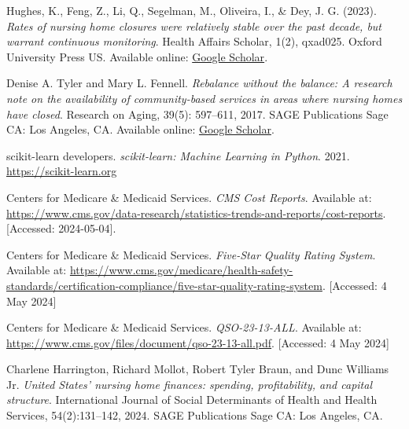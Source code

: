 \documentclass{article}
\theoremstyle{mytheoremstyle}
\theoremstyle{mytheoremstyle}
\theoremstyle{myproblemstyle}
\begin{document}
\begin{thebibliography}{9}

Hughes, K., Feng, Z., Li, Q., Segelman, M., Oliveira, I., \& Dey, J. G. (2023).
\textit{Rates of nursing home closures were relatively stable over the past decade, but warrant continuous monitoring}.
Health Affairs Scholar, 1(2), qxad025. Oxford University Press US. Available online: \href{https://scholar.google.com/scholar_lookup?journal=Heal+Aff+Sch&title=Rates+of+nursing+home+closures+were+relatively+stable+over+the+past+decade,+but+warrant+continuous+monitoring&author=K+Hughes&author=Z+Feng&author=Q+Li&volume=1&issue=2&publication_year=2023&d=gs_cit&t=1714807740518&u=%2Fscholar%3Fq%3Dinfo%3AT6cB2hNX4sgJ%3Ascholar.google.com%2F%26output%3Dcite%26scirp%3D0%26hl%3Den}{Google Scholar}.

Denise A. Tyler and Mary L. Fennell.
\textit{Rebalance without the balance: A research note on the availability of community-based services in areas where nursing homes have closed}.
Research on Aging, 39(5): 597--611, 2017.
SAGE Publications Sage CA: Los Angeles, CA. Available online: \href{https://scholar.google.com/scholar_lookup?journal=Heal+Aff+Sch&title=Rates+of+nursing+home+closures+were+relatively+stable+over+the+past+decade,+but+warrant+continuous+monitoring&author=K+Hughes&author=Z+Feng&author=Q+Li&volume=1&issue=2&publication_year=2023&}{Google Scholar}.

scikit-learn developers. 
\textit{scikit-learn: Machine Learning in Python}. 
2021. 
\url{https://scikit-learn.org}

Centers for Medicare \& Medicaid Services.
\textit{CMS Cost Reports}. 
Available at: \url{https://www.cms.gov/data-research/statistics-trends-and-reports/cost-reports}.
[Accessed: 2024-05-04].

Centers for Medicare \& Medicaid Services.
\textit{Five-Star Quality Rating System}. 
Available at: \url{https://www.cms.gov/medicare/health-safety-standards/certification-compliance/five-star-quality-rating-system}.
[Accessed: 4 May 2024]

Centers for Medicare \& Medicaid Services.
\textit{QSO-23-13-ALL}. 
Available at: \url{https://www.cms.gov/files/document/qso-23-13-all.pdf}.
[Accessed: 4 May 2024]

Charlene Harrington, Richard Mollot, Robert Tyler Braun, and Dunc Williams Jr.
\textit{United States' nursing home finances: spending, profitability, and capital structure}.
International Journal of Social Determinants of Health and Health Services, 54(2):131--142, 2024.
SAGE Publications Sage CA: Los Angeles, CA.


\end{thebibliography}
\end{document}
